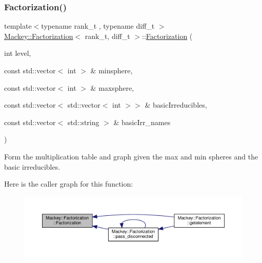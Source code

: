 \subsubsection{\texorpdfstring{Factorization()}{Factorization()}\hspace{0.1cm}{\footnotesize\ttfamily [1/2]}}
{\footnotesize\ttfamily template$<$typename rank\+\_\+t , typename diff\+\_\+t $>$ \\
\hyperlink{classMackey_1_1Factorization}{Mackey\+::\+Factorization}$<$ rank\+\_\+t, diff\+\_\+t $>$\+::\hyperlink{classMackey_1_1Factorization}{Factorization} (\begin{DoxyParamCaption}\item[{int}]{level,  }\item[{const std\+::vector$<$ int $>$ \&}]{minsphere,  }\item[{const std\+::vector$<$ int $>$ \&}]{maxsphere,  }\item[{const std\+::vector$<$ std\+::vector$<$ int $>$$>$ \&}]{basic\+Irreducibles,  }\item[{const std\+::vector$<$ std\+::string $>$ \&}]{basic\+Irr\+\_\+names }\end{DoxyParamCaption})}



Form the multiplication table and graph given the max and min spheres and the basic irreducibles. 

Here is the caller graph for this function\+:\nopagebreak
\begin{figure}[H]
\begin{center}
\leavevmode
\includegraphics[width=350pt]{classMackey_1_1Factorization_af1b07ab5021c4e51698c4cd3fbb85422_icgraph}
\end{center}
\end{figure}
\mbox{\label{classMackey_1_1Factorization_a4d55bc1d6f94bdbcd365ed1bb0eaa2cb}} 
